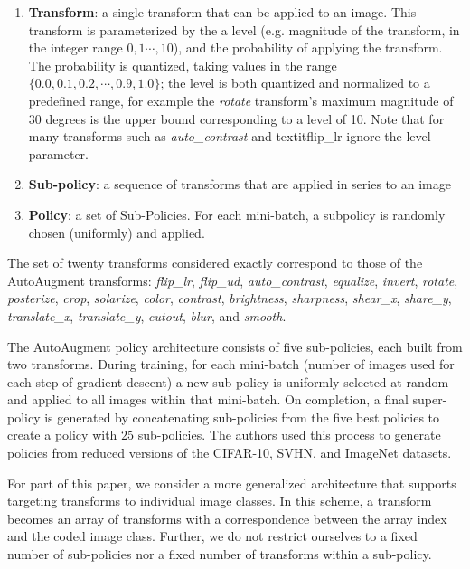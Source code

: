 \documentclass[10pt,twocolumn,letterpaper]{article}
\begin{document}
	\begin{enumerate}
	
		\item[] 
			\textbf{Transform}: a single transform that can be applied to an image. This transform is parameterized by the a level (e.g. magnitude of the transform, in the integer range $0,1 \cdots, 10$), and the probability of applying the transform. The probability is quantized, taking values in the range $\{0.0, 0.1, 0.2, \cdots, 0.9, 1.0\}$; the level is both quantized and normalized to a predefined range, for example the \textit{rotate} transform's maximum magnitude of $30$ degrees is the upper bound corresponding to a level of 10. Note that for many transforms such as \textit{auto\_contrast} and textit{flip\_lr} ignore the level parameter.
		\item[] 
			\textbf{Sub-policy}: a sequence of transforms that are applied in series to an image
		\item[] 
			\textbf{Policy}: a set of Sub-Policies. For each mini-batch, a subpolicy is randomly chosen (uniformly) and applied.
	\end{enumerate}

	The set of twenty transforms considered exactly correspond to those of the AutoAugment transforms: \textit{flip\_lr}, \textit{flip\_ud}, \textit{auto\_contrast}, \textit{equalize}, \textit{invert}, \textit{rotate}, \textit{posterize}, \textit{crop}, \textit{solarize}, \textit{color}, \textit{contrast}, \textit{brightness}, \textit{sharpness}, \textit{shear\_x}, \textit{share\_y}, \textit{translate\_x}, \textit{translate\_y}, \textit{cutout}, \textit{blur}, and \textit{smooth}. 

	The AutoAugment policy architecture consists of five sub-policies, each built from two transforms. During training, for each mini-batch (number of images used for each step of gradient descent) a new sub-policy is uniformly selected at random and applied to all images within that mini-batch. On completion, a final super-policy is generated by concatenating sub-policies from the five best policies to create a policy with $25$ sub-policies. The authors used this process to generate policies from reduced versions of the CIFAR-10, SVHN, and ImageNet datasets. 

	For part of this paper, we consider a more generalized architecture that supports targeting transforms to individual image classes. In this scheme, a transform becomes an array of transforms with a correspondence between the array index and the coded image class. Further, we do not restrict ourselves to a fixed number of sub-policies nor a fixed number of transforms within a sub-policy.
\end{document}

